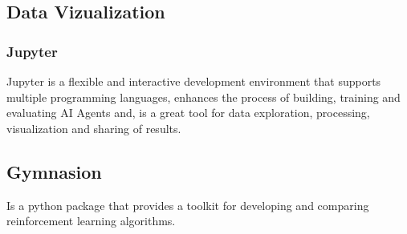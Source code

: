 \subsection{Data Vizualization}

\subsubsection{Jupyter}
Jupyter is a flexible and interactive development environment that supports multiple 
programming languages, enhances the process of building, training and evaluating AI Agents and,
is a great tool for data exploration, processing, visualization and sharing of results.

\subsection{Gymnasion}
Is a python package that provides a toolkit for developing and comparing reinforcement learning algorithms.





